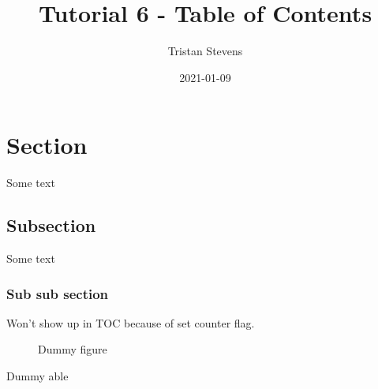 \documentclass{article}
\title{Tutorial 6 - Table of Contents}
\date{2021-01-09}
\author{Tristan Stevens}
\begin{document}
\maketitle
\doublespacing
\tableofcontents
\singlespacing
\newpage

\section{Section}
Some text
\subsection{Subsection}
Some text
\subsubsection{Sub sub section}
Won't show up in TOC because of set counter flag.


\begin{figure}
\caption{Dummy figure}
\end{figure}

\begin{table}
\caption{Dummy able}
\end{table}

\newpage

\begin{appendix}
\listoffigures
\listoftables
\end{appendix}
\end{document}
